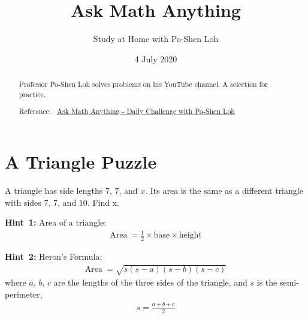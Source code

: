 \documentclass[12pt]{article}
\title{Ask Math Anything}
\author{Study at Home with Po-Shen Loh}
\date{4 July 2020}
\begin{document}
\begin{minipage}{\textwidth}
\maketitle
\begin{abstract}
Professor Po-Shen Loh solves problems on his YouTube channel. A selection for practice. 

Reference:~ 
\href{https://www.youtube.com/channel/UCf78EJOm4wQ4xXwSS15PuxQ}{Ask Math Anything - Daily Challenge with Po-Shen Loh}
\end{abstract}
\end{minipage}


\section*{A Triangle Puzzle}
A triangle has side lengths $7$, $7$, and $x$. Its area is the same as a different triangle with sides $7$, $7$, and $10$. Find x.

\textbf{Hint~1:} Area of a triangle:
\begin{align*}
\text{Area}~ 
= \frac{1}{2} \times \text{base} \times \text{height}
\end{align*}

\textbf{Hint~2:} Heron's Formula:
\begin{align*}
\text{Area}~ 
= \sqrt{s(s-a)(s-b)(s-c)}
\end{align*}
where $a$, $b$, $c$ are the lengths of the three sides of the triangle, and $s$ is the semi-perimeter,
\begin{align*}
s = \frac{a+b+c}{2}
\end{align*}
\end{document}

